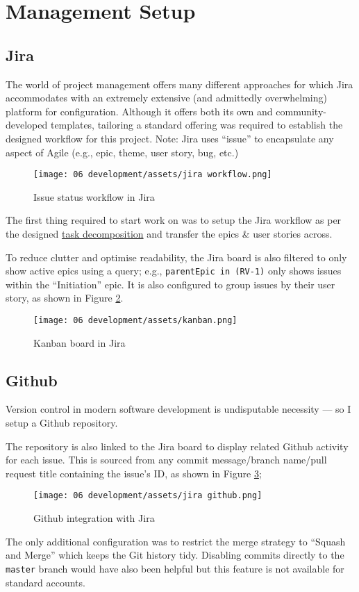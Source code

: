 \section{Management Setup}

\subsection{Jira}
The world of project management offers many different
approaches for which Jira accommodates with an extremely
extensive (and admittedly overwhelming) platform for
configuration.
Although it offers both its own and community-developed
templates, tailoring a standard offering was required to
establish the designed workflow for this project.
Note: Jira uses \enquote{issue} to encapsulate any aspect
of Agile (e.g., epic, theme, user story, bug, etc.)

\begin{figure}[h]
  \centering
  \texttt{[image: 06
    development/assets/jira workflow.png]}
  \caption{Issue status workflow in Jira}
  \label{fig:workflow}
\end{figure}

The first thing required to start work on \projectname{}
was to setup the Jira workflow as per the designed
\hyperref[p:decomp]{task decomposition} and transfer the
epics \& user stories across.

To reduce clutter and optimise readability, the Jira board
is also filtered to only show active epics using a query;
e.g., \lstinline{parentEpic in (RV-1)} only shows issues
within the \enquote{Initiation} epic.
It is also configured to group issues by their user story,
as shown in Figure \ref{fig:kanban}.

\begin{figure}[h]
  \centering
  \texttt{[image: 06
    development/assets/kanban.png]}
  \caption{Kanban board in Jira}
  \label{fig:kanban}
\end{figure}

\subsection{Github}
Version control in modern software development is
undisputable necessity --- so I setup a
Github repository. 

The repository is also linked to the Jira board to display
related Github activity for each issue. This is sourced from 
any commit message/branch name/pull request title
containing the issue's ID, as shown in Figure
\ref{fig:jiraGithub};

\begin{figure}[h]
  \centering
  \texttt{[image: 06
    development/assets/jira github.png]}
  \caption{Github integration with Jira}
  \label{fig:jiraGithub}
\end{figure}

The only additional configuration was to restrict the merge
strategy to \enquote{Squash and Merge} which keeps the Git
history tidy. Disabling commits directly to the
\lstinline{master} branch would have also been helpful but
this feature is not available for standard accounts.